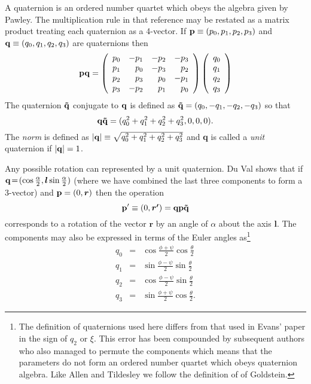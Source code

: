 A quaternion  is an ordered number  quartet  which obeys  the  algebra
given  by   Pawley\cite{pawley:81}.  The multiplication   rule in that
reference may be restated as a matrix product treating each quaternion
as a  4-vector.  If  ${\bf p} \equiv (p_0,p_1,p_2,p_3)$ and  ${\bf q}
\equiv  (q_0,q_1,q_2,q_3)$  are quaternions then
\begin{equation}
{\bf pq} = 
\left(
\begin{array}{rrrr}
p_0 & -p_1 & -p_2 & -p_3 \\
p_1 &  p_0 & -p_3 &  p_2 \\
p_2 &  p_3 &  p_0 & -p_1 \\
p_3 & -p_2 &  p_1 &  p_0 
\end{array}
\right) \left(
\begin{array}{r}
q_0 \\ q_1 \\ q_2 \\ q_3
\end{array}
\right)
\end{equation}
The quaternion $ {\bf \tilde{q}} $ conjugate to ${\bf q}$ is defined
as ${\bf \tilde{q}} = (q_0,-q_1,-q_2,-q_3)$ so that
\begin{equation}
{\bf q\tilde{q}} = (q_0^2+q_1^2+q_2^2+q_3^2,0,0,0).
\label{eqn:qnorm}
\end{equation}
The {\em norm\/} is defined as $ |{\bf q}| \equiv
\sqrt{q_0^2+q_1^2+q_2^2+q_3^2} $ and {\bf q} is called a {\em unit\/}
quaternion if $ |{\bf q}| = 1 $.  

Any possible rotation can represented by a unit quaternion. Du Val 
shows\cite{duval:64} that if $ {\bf q} \! = \! (\cos \frac{\alpha}{2}, \mbox{\boldmath \protect\(l\protect\)} \sin
\frac{\alpha}{2}) $ (where we have combined the last three components to form
a 3-vector) and ${\bf p} = (0,\mbox{\boldmath \protect\(r\protect\)})$ then the operation
\begin{equation}
{\bf p'} \equiv (0,\mbox{\boldmath \protect\(r'\protect\)}) = {\bf q p \tilde{q}}
\end{equation}
corresponds to a rotation of the vector $\bm{r}$ by an angle of
$\alpha$ about the axis $\bm{l}$.  The components may also be
expressed in terms of the Euler angles as\footnote{The definition of
quaternions used here differs from that used in Evans' paper\cite[equation 21]{evans:77} in the sign of $q_2$ or $\xi$.  This
error has been compounded by subsequent authors\cite{sonnenschein:85,smith:82,laakonsen:85} who also managed to 
permute the components which means that the parameters do not form an
ordered number quartet which obeys quaternion algebra. Like Allen and
Tildesley\cite[page 88]{allen:87} we follow the definition of of
Goldstein\cite[pages 143 and 155]{goldstein:80}.}
\begin{eqnarray}
q_0 & = & \cos \frac{\phi+\psi}{2} \cos \frac{\theta}{2} \nonumber \\
q_1 & = & \sin \frac{\phi-\psi}{2} \sin \frac{\theta}{2} \nonumber \\
q_2 & = & \cos \frac{\phi-\psi}{2} \sin \frac{\theta}{2} \nonumber \\
q_3 & = & \sin \frac{\phi+\psi}{2} \cos \frac{\theta}{2}.
\end{eqnarray}

